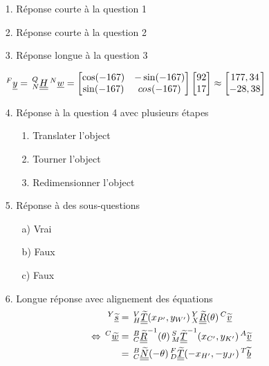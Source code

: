 \documentclass{gif7001}
\begin{document}
\vcourt

\begin{enumerate}
    \item[1.] Réponse courte à la question 1
    \item[2.] Réponse courte à la question 2
    \item[3.] Réponse longue à la question 3
    
    $^F\vvec{y} = \vrep[N]{Q}\vmat{H} \vrep{N}\vvec{w} = \begin{bmatrix} \cos(-167) & -\sin(-167) \\ \sin(-167) & cos(-167) \end{bmatrix} \begin{bmatrix} 92 \\ 17 \end{bmatrix} \approx \begin{bmatrix} 177,34 \\ -28,38 \end{bmatrix}$
    \item[4.] Réponse à la question 4 avec plusieurs étapes
    \begin{enumerate}
        \item[1.] Translater l'object
        \item[2.] Tourner l'object
        \item[3.] Redimensionner l'object
    \end{enumerate}
    \item[5.] Réponse à des sous-questions
    \begin{enumerate}
        \item[a)] Vrai
        \item[b)] Faux
        \item[c)] Faux
    \end{enumerate}
    \item[6.] Longue réponse avec alignement des équations
    \begin{align*}
        \vrep{Y}\vvech{s} &= \vrep[H]{V}\vmath{T}(x_{P'},y_{W'}) \vrep[X]{Y}\vmath{R}(\theta) \vrep{C}\vvech{v} \\
        \Leftrightarrow \vrep{C}\vvech{w} &= \vrep[C]{B}\vmath{R}^{-1}(\theta) \vrep[M]{S}\vmath{T}^{-1}(x_{C'},y_{K'}) \vrep{A}\vvech{v} \\
        &= \vrep[C]{B}\vmath{N}(-\theta) \vrep[D]{F}\vmath{T}(-x_{H'},-y_{J'}) \vrep{T}\vvech{b} \\

\end{align*}
\end{enumerate}
\end{document}

